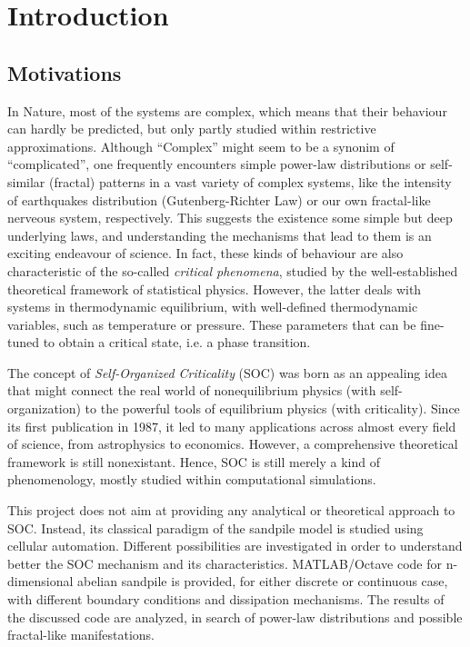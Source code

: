 \chapter{Introduction}
\thispagestyle{fancy}

\section{Motivations}
In Nature, most of the systems are complex, which means that their behaviour can hardly be predicted, but only partly studied within restrictive approximations. Although ``Complex'' might seem to be a synonim of ``complicated'', one frequently encounters simple power-law distributions or self-similar (fractal) patterns in a vast variety of complex systems, like the intensity of earthquakes distribution (Gutenberg-Richter Law) or our own fractal-like nerveous system, respectively. This suggests the existence some simple but deep underlying laws, and understanding the mechanisms that lead to them is an exciting endeavour of science. In fact, these kinds of behaviour are also characteristic of the so-called \emph{critical phenomena}, studied by the well-established theoretical framework of statistical physics. However, the latter deals with systems in thermodynamic equilibrium, with well-defined thermodynamic variables, such as temperature or pressure. These parameters that can be fine-tuned to obtain a critical state, i.e. a phase transition.

The concept of \emph{Self-Organized Criticality} (SOC) was born as an appealing idea that might connect the real world of nonequilibrium physics (with self-organization) to the powerful tools of equilibrium physics (with criticality). Since its first publication in 1987, it led to many applications across almost every field of science, from astrophysics to economics. However, a comprehensive theoretical framework is still nonexistant. Hence, SOC is still merely a kind of phenomenology, mostly studied within computational simulations.
 
This project does not aim at providing any analytical or theoretical approach to SOC. Instead, its classical paradigm of the sandpile model is studied using cellular automation. Different possibilities are investigated in order to understand better the SOC mechanism and its characteristics. MATLAB/Octave code for n-dimensional abelian sandpile is provided, for either discrete or continuous case, with different boundary conditions and dissipation mechanisms. The results of the discussed code are analyzed, in search of power-law distributions and possible fractal-like manifestations.

